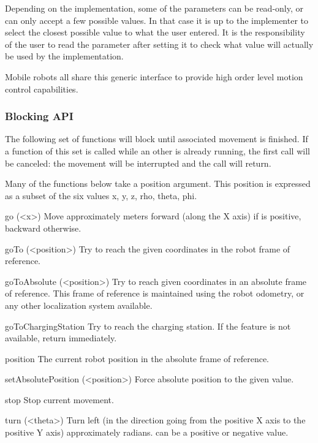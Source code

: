 Depending on the implementation, some of the parameters can be read-only, or
can only accept a few possible values. In that case it is up to the implementer
to select the closest possible value to what the user entered. It is the
responsibility of the user to read the parameter after setting it to check
what value will actually be used by the implementation.



Mobile robots all share this generic interface to provide high order
level motion control capabilities.

\subsubsection{Blocking API}

The following set of functions will block until associated movement is
finished.  If a function of this set is called while an other is already
running, the first call will be canceled: the movement will be interrupted
and the call will return.

Many of the functions below take a position argument. This position is
expressed as a subset of the six values x, y, z, rho, theta, phi.

\begin{urbiscriptapi}
\item[go](<x>) Move approximately  meters forward (along the X axis)
  if  is positive, backward otherwise.


\item[goTo](<position>) Try to reach the given coordinates in the robot
  frame of reference.


\item[goToAbsolute](<position>) Try to reach given coordinates in an
  absolute frame of reference. This frame of reference is maintained using
  the robot odometry, or any other localization system available.


\item[goToChargingStation] Try to reach the charging station. If the feature
  is not available, return immediately.


\item[position] The current robot position in the absolute frame of
  reference.


\item[setAbsolutePosition](<position>) Force absolute position to the given
  value.


\item[stop] Stop current movement.


\item[turn](<theta>) Turn left (in the direction going from the positive X
  axis to the positive Y axis) approximately  radians.
   can be a positive or negative value.
\end{urbiscriptapi}

